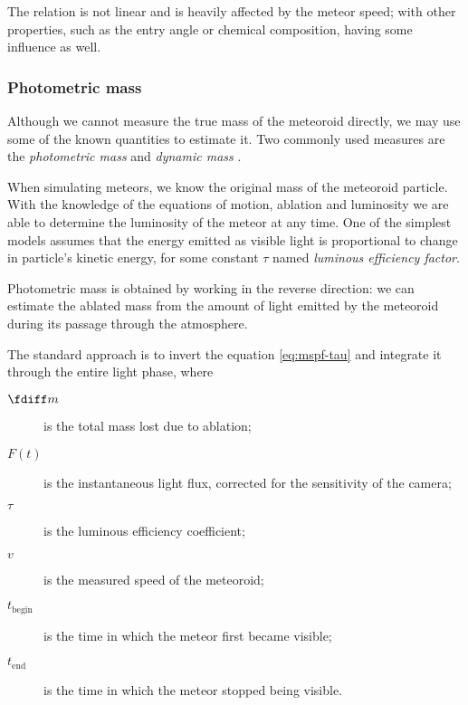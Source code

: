             The relation is not linear and is heavily affected by the meteor speed; with other properties,
            such as the entry angle or chemical composition, having some influence as well.

        \subsubsection{Photometric mass} \label{mspf}
            Although we cannot measure the true mass of the meteoroid directly,
            we may use some of the known quantities to estimate it.
            Two commonly used measures are the \emph{photometric mass} and \emph{dynamic mass} \citep{ceplecha1966}.

            When simulating meteors, we know the original mass of the meteoroid particle.
            With the knowledge of the equations of motion, ablation and luminosity
            we are able to determine the luminosity of the meteor at any time.
            One of the simplest models \citep{hill+2005} assumes that the energy emitted as visible light
            is proportional to change in particle's kinetic energy,
            for some constant $\tau$ named \emph{luminous efficiency factor}.

            Photometric mass is obtained by working in the reverse direction: we can estimate the
            ablated mass from the amount of light emitted by the meteoroid during its passage through the atmosphere.

            The standard approach is to invert the equation \cref{eq:mspf-tau} and integrate it
            through the entire light phase,
            where
            \begin{description}
                \item[$\fdiff m$]
                    is the total mass lost due to ablation;
                \item[$F(t)$]
                    is the instantaneous light flux, corrected for the sensitivity of the camera;
                \item[$\tau$]
                    is the luminous efficiency coefficient;
                \item[$v$]
                    is the measured speed of the meteoroid;
                \item[$t_\mathrm{begin}$]
                    is the time in which the meteor first became visible;
                \item[$t_\mathrm{end}$]
                    is the time in which the meteor stopped being visible.
            \end{description}

